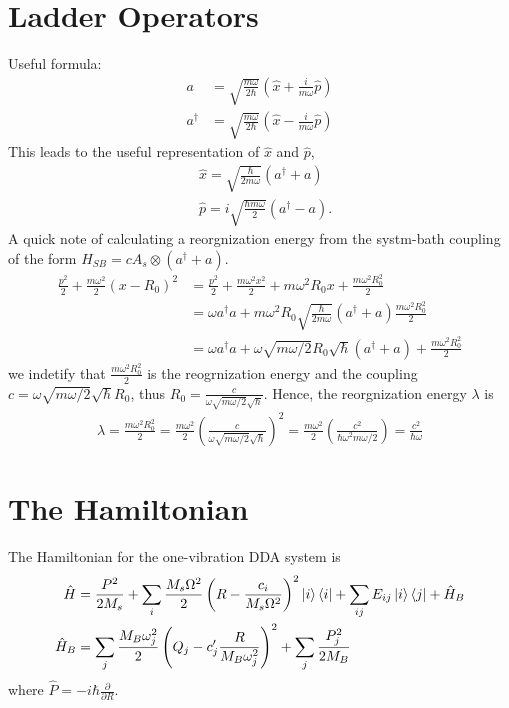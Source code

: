 \documentclass{article}
\begin{document}
\section*{Ladder Operators}

Useful formula:
$$
\begin{aligned}
	a &=\sqrt{\frac{m \omega}{2 \hbar}}\left(\hat{x}+\frac{i}{m \omega} \hat{p}\right) \\
	a^{\dagger} &=\sqrt{\frac{m \omega}{2 \hbar}}\left(\hat{x}-\frac{i}{m \omega} \hat{p}\right)
\end{aligned}
$$
This leads to the useful representation of $\hat{x}$ and $\hat{p}$,
$$
\begin{aligned}
	&\hat{x}=\sqrt{\frac{\hbar}{2 m \omega}}\left(a^{\dagger}+a\right) \\
	&\hat{p}=i \sqrt{\frac{\hbar m \omega}{2}}\left(a^{\dagger}-a\right).
\end{aligned}
$$
A quick note of calculating a reorgnization energy from the systm-bath coupling of the form $H_{SB}=cA_{s}\otimes (a^\dagger+a)$.
\begin{align}
	\frac{p^2}{2}+\frac{m\omega^2}{2}(x-R_0)^2 & = \frac{p^2}{2}+\frac{m\omega^2 x^2}{2} + m\omega^2R_0x + \frac{m\omega^2R_0^2}{2} \\
	& = \omega a^\dagger a + m\omega^2R_0\sqrt{\frac{\hbar}{2 m \omega}}\left(a^{\dagger}+a\right) \frac{m\omega^2R_0^2}{2} \\
	& = \omega a^\dagger a + \omega\sqrt{m\omega/2}R_0\sqrt{\hbar}\left(a^{\dagger}+a\right) + \frac{m\omega^2R_0^2}{2}
\end{align}
we indetify that $\frac{m\omega^2R_0^2}{2}$ is the reogrnization energy and the coupling $c=\omega\sqrt{m\omega/2}\sqrt{\hbar}R_0$, thus $R_0=\frac{c}{\omega\sqrt{m\omega/2}\sqrt{\hbar}}$. Hence, the reorgnization energy $\lambda$ is
\begin{align}
	\lambda = \frac{m\omega^2R_0^2}{2} = \frac{m\omega^2}{2} \left(\frac{c}{\omega\sqrt{m\omega/2}\sqrt{\hbar}}\right)^2 = \frac{m\omega^2}{2} \left(\frac{c^2}{\hbar\omega^2 m\omega/2}\right) = \frac{c^2}{\hbar\omega}
\end{align}


\section*{The Hamiltonian}
The Hamiltonian for the one-vibration DDA system is
\begin{align*}
	\hat{H}&=\frac{P^{2}}{2 M_s}+\sum_{i} \frac{M_{s} \Omega^{2}}{2} \left(R-\frac{c_{i}}{M_{s} \Omega^{2}}\right)^{2}\ket{i}\bra{i}+\sum_{ij}E_{ij}\ket{i}\bra{j}+\hat{H}_{B}\\
	\hat{H}_{B}&=\sum_j \frac{M_{B} \omega_{j}^{2}}{2} \left(Q_{j}-c^{\prime}_{j} \frac{R}{M_{B} \omega_{j}^{2}}\right)^{2} + \sum_j\frac{P_j^2}{2M_B}
\end{align*}
where $\hat{P}=-i\hbar\frac{\partial}{\partial R}$.
\end{document}
